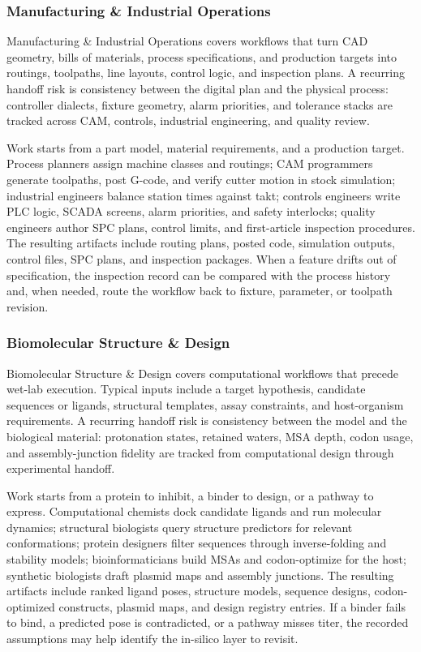 \documentclass{llmxive}
\begin{document}
\subsubsection{Manufacturing \& Industrial Operations}
Manufacturing \& Industrial Operations covers workflows that turn CAD geometry, bills of materials,
process specifications, and production targets into routings, toolpaths, line layouts, control logic,
and inspection plans. A recurring handoff risk is consistency between the digital plan and the physical
process: controller dialects, fixture geometry, alarm priorities, and tolerance stacks are tracked
across CAM, controls, industrial engineering, and quality review.

Work starts from a part model, material requirements, and a production target. Process planners
assign machine classes and routings; CAM programmers generate toolpaths, post G-code, and verify
cutter motion in stock simulation; industrial engineers balance station times against takt; controls
engineers write PLC logic, SCADA screens, alarm priorities, and safety interlocks; quality engineers
author SPC plans, control limits, and first-article inspection procedures. The resulting artifacts
include routing plans, posted code, simulation outputs, control files, SPC plans, and inspection
packages. When a feature drifts out of specification, the inspection record can be compared with the
process history and, when needed, route the workflow back to fixture, parameter, or toolpath
revision.

\subsubsection{Biomolecular Structure \& Design}
Biomolecular Structure \& Design covers computational workflows that precede wet-lab execution.
Typical inputs include a target hypothesis, candidate sequences or ligands, structural templates,
assay constraints, and host-organism requirements. A recurring handoff risk is consistency between the
model and the biological material: protonation states, retained waters, MSA depth, codon usage, and
assembly-junction fidelity are tracked from computational design through experimental handoff.

Work starts from a protein to inhibit, a binder to design, or a pathway to express. Computational
chemists dock candidate ligands and run molecular dynamics; structural biologists query structure
predictors for relevant conformations; protein designers filter sequences through inverse-folding
and stability models; bioinformaticians build MSAs and codon-optimize for the host; synthetic
biologists draft plasmid maps and assembly junctions. The resulting artifacts include ranked ligand
poses, structure models, sequence designs, codon-optimized constructs, plasmid maps, and design
registry entries. If a binder fails to bind, a predicted pose is contradicted, or a pathway misses
titer, the recorded assumptions may help identify the in-silico layer to revisit.
\end{document}

